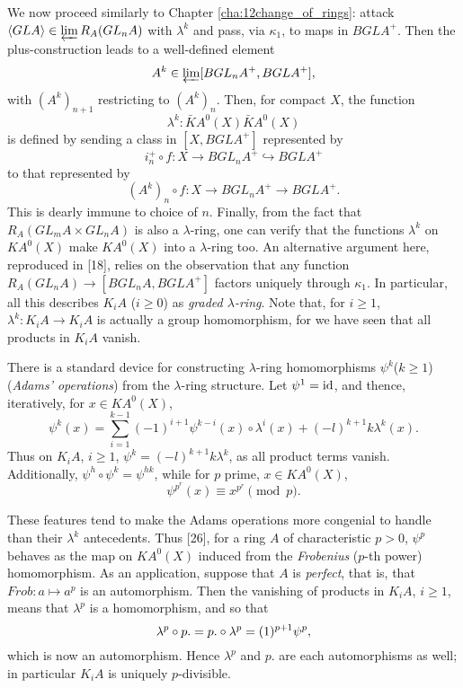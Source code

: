 We now proceed similarly to Chapter \ref{cha:12change_of_rings}: attack $\langle GLA \rangle \in \varprojlim R_A(GL_nA)$ with $\lambda^k$ and pass, via $\kappa_1$, to maps in $BGLA^+$. Then the plus-construction leads to a well-defined element
\[A^k \in \varprojlim [BGL_nA^+, BGLA^+],\]
with $(A^k)_{n+1}$ restricting to $(A^k)_{n}$. Then, for compact $X$, the function 
\[\lambda^k \colon \bar{K}A^0(X) \bar{K}A^0(X)\]
is defined by sending a class in $[X, BGLA^+]$ represented by 
\[i_n^+\circ f \colon X \longrightarrow BGL_nA^+ \hookrightarrow BGLA^+\]
to that represented by
\[(A^k)_n \circ  f : X \longrightarrow BGL_nA^+ \longrightarrow BGLA^+ .\]
This is dearly immune to choice of $n$. Finally, from the fact that $R_A(GL_mA \times GL_nA)$ is also a $\lambda$-ring, one can verify that the functions $\lambda^k$ on $KA^0(X)$ make $KA^0(X)$ into a $\lambda$-ring too. An alternative argument here, reproduced in [18], relies on the observation that any function $R_A(GL_nA) \longrightarrow [BGL_nA, BGLA^+]$ factors uniquely through $\kappa_1$. In particular, all this describes $K_iA$ ($i \geqslant 0$) as {\em graded $\lambda$-ring}. Note that, for $i \geqslant 1$, $\lambda^k \colon K_iA \longrightarrow K_iA$ is actually a group homomorphism, for we have seen that all products in $K_iA$ vanish.

There is a standard device for constructing $\lambda$-ring homomorphisms $\psi^k$($k \geqslant 1$) ({\em Adams' operations}) from the $\lambda$-ring structure. Let $\psi^1 = \mathrm{id}$, and thence, iteratively, for $x \in KA^0(X)$,
\[\psi^k(x) = \sum_{i=1}^{k-1} (-1)^{i+1}\psi^{k-i}(x)\circ \lambda^i(x) + (-l)^{k+1}k\lambda^k(x).\]
Thus on $K_iA$, $i\geqslant 1$, $\psi^k= (-l)^{k+1}k\lambda^k$, as all product terms vanish. Additionally, $\psi^h\circ \psi^k=\psi^{hk}$, while for $p$ prime, $x \in KA^0(X)$,
\[\psi^{p^r}(x) \equiv x^{p^r} \pmod p.\]

These features tend to make the Adams operations more congenial to handle than their $\lambda^k$ antecedents. Thus [26], for a ring $A$ of characteristic $p > 0$, $\psi^p$ behaves as the map on $KA^0(X)$ induced from the {\em Frobenius} ($p$-th power) homomorphism. As an application, suppose that $A$ is {\em perfect}, that is, that $Frob\colon a \mapsto a^p$ is an automorphism. Then the vanishing of products in $K_iA$, $i \geqslant 1$, means that $\lambda^p$ is a homomorphism, and so that
\[\lambda^p \circ p. = p. \circ \lambda^p = (\-1)^{p+1}\psi^p ,\]
which is now an automorphism. Hence $\lambda^p$ and $p.$ are each automorphisms as well; in particular $K_iA$ is uniquely $p$-divisible.

